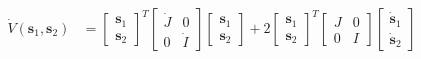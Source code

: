 \color{blue} %
\begin{equation}
\begin{aligned}
\dot{V}({\boldsymbol s}_1, {\boldsymbol s}_2) & = 
\begin{bmatrix}
{\boldsymbol s}_1 \\
{\boldsymbol s}_2
\end{bmatrix} ^{T}
\begin{bmatrix}
\dot{J} & 0 \\
0 & \dot{I}
\end{bmatrix}
\begin{bmatrix}
{\boldsymbol s}_1 \\
{\boldsymbol s}_2
\end{bmatrix}
+ 2
\begin{bmatrix}
{\boldsymbol s}_1 \\
{\boldsymbol s}_2
\end{bmatrix} ^{T}
\begin{bmatrix}
J & 0 \\
0 & I
\end{bmatrix}
\begin{bmatrix}
\dot{\boldsymbol s}_1 \\
\dot{\boldsymbol s}_2
\end{bmatrix} \\

\end{aligned}
\end{equation}
